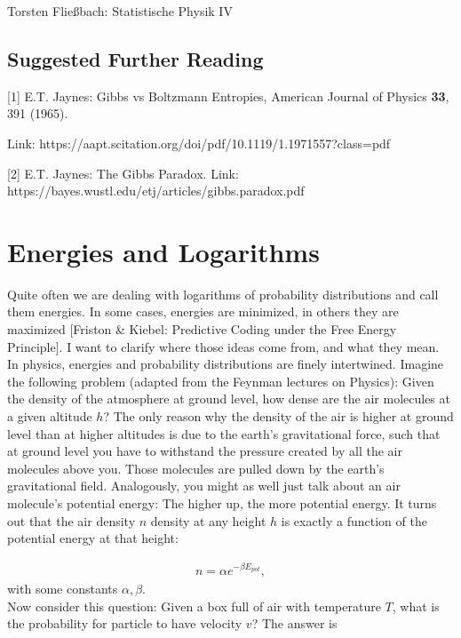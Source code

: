 Torsten Fließbach: Statistische Physik IV


\subsection{Suggested Further Reading}

[1] E.T. Jaynes: Gibbs vs Boltzmann Entropies, American Journal of Physics \textbf{33}, 391 (1965).

Link: https://aapt.scitation.org/doi/pdf/10.1119/1.1971557?class=pdf

[2] E.T. Jaynes: The Gibbs Paradox. Link: https://bayes.wustl.edu/etj/articles/gibbs.paradox.pdf

\section{Energies and Logarithms}
\label{sec:EnergiesAndLogs}

Quite often we are dealing with logarithms of probability distributions and call them energies. In some cases, energies are minimized, in others they are maximized [Friston \& Kiebel: Predictive Coding under the Free Energy Principle].  I want to clarify where those ideas come from, and what they mean. \\

\noindent  In physics, energies and probability distributions are finely intertwined. Imagine the following problem (adapted from the Feynman lectures on Physics): Given the density of the atmosphere at ground level, how dense are the air molecules at a given altitude $h$? The only reason why the density of the air is higher at ground level than at higher altitudes is due to the earth's gravitational force, such that at ground level you have to withstand the pressure created by all the air molecules above you. Those molecules are pulled down by the earth's gravitational field. Analogously, you might as well just talk about an air molecule's potential energy: The higher up, the more potential energy. It turns out that the air density $n$ density at any height $h$ is exactly a function of the potential energy at that height:

\begin{align*}
n = \alpha e^{-\beta E_{pot}},
\end{align*}
with some constants $\alpha, \beta$. \\

\noindent Now consider this question: Given a box full of air with temperature $T$, what is the probability for particle to have velocity $v$? The answer is

